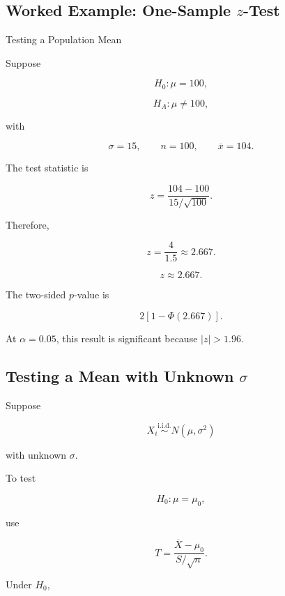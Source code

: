 \subsection{Worked Example: One-Sample \(z\)-Test}
\label{subsec:worked-one-sample-z-test}

\begin{workedexamplebox}{Testing a Population Mean}

Suppose

\[
H_0:\mu=100,
\]

\[
H_A:\mu\neq100,
\]

with

\[
\sigma=15,
\qquad
n=100,
\qquad
\overline{x}=104.
\]

The test statistic is

\[
z
=
\frac{
104-100
}{
15/\sqrt{100}
}.
\]

Therefore,

\[
z
=
\frac4{1.5}
\approx
2.667.
\]

\begin{answerbox}
\[
\boxed{
z\approx2.667.
}
\]

The two-sided \(p\)-value is

\[
\boxed{
2[1-\Phi(2.667)].
}
\]
\end{answerbox}

At \(\alpha=0.05\), this result is significant because
\(|z|>1.96\).

\end{workedexamplebox}

\subsection{Testing a Mean with Unknown \(\sigma\)}
\label{subsec:one-sample-t-test}

Suppose

\[
X_i
\overset{\text{i.i.d.}}{\sim}
N(\mu,\sigma^2)
\]

with unknown \(\sigma\).

To test

\[
H_0:\mu=\mu_0,
\]

use

\[
\boxed{
T
=
\frac{
\overline{X}-\mu_0
}{
S/\sqrt{n}
}.
}
\]

Under \(H_0\),

